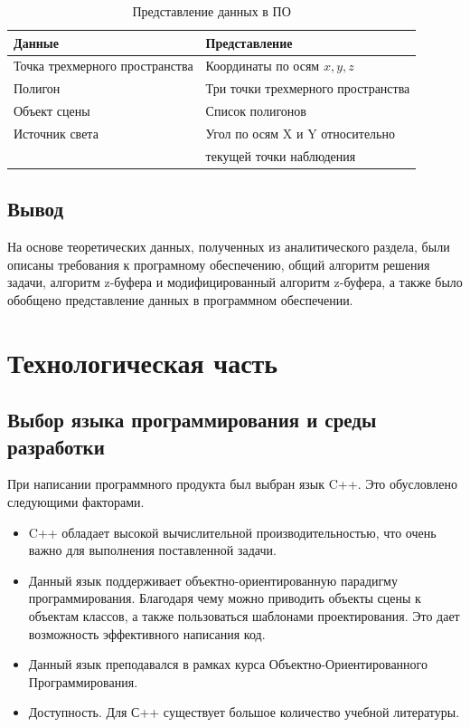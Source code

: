 \documentclass[a4paper,14pt, unknownkeysallowed]{extreport}
\begin{document}
\begin{center}
\captionsetup{justification=raggedright,singlelinecheck=off}
\begin{longtable}[c]{|l|l|}
\caption{Представление данных в ПО\label{tbl:table_1}}
	\\ \hline
	\textbf{Данные} & \textbf{Представление} 
	\\ \hline
	Точка трехмерного пространства & Координаты по осям $x, y, z$
	\\ \hline
	Полигон & Три точки трехмерного пространства
	\\ \hline
	Объект сцены & Список полигонов
	\\ \hline
	Источник света & Угол по осям X и Y относительно \\ & текущей точки наблюдения
	\\ \hline
\end{longtable}
\end{center}

\section{Вывод}

На основе теоретических данных, полученных из аналитического раздела, были описаны требования к програмному обеспечению, общий алгоритм решения задачи, алгоритм z-буфера и модифицированный алгоритм z-буфера, а также было обобщено представление данных в программном обеспечении.


\chapter{Технологическая часть}

\section{Выбор языка программирования и среды разработки}

При написании программного продукта был выбран язык C++. Это обусловлено следующими факторами.

\begin{itemize}
	\item C++ обладает высокой вычислительной производительностью, что очень важно для выполнения поставленной задачи.
	\item Данный язык поддерживает объектно-ориентированную парадигму программирования. Благодаря чему можно приводить объекты сцены к объектам классов, а также пользоваться шаблонами проектирования. Это дает возможность эффективного написания код.
	\item Данный язык преподавался в рамках курса Объектно-Ориентированного Программирования.
	\item Доступность. Для С++ существует большое количество учебной литературы.
\end{itemize}
\end{document}
